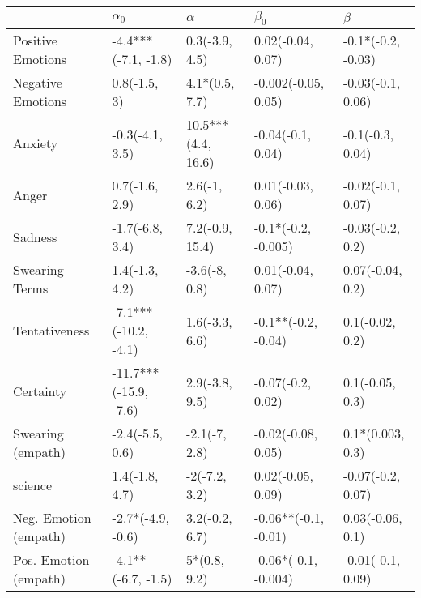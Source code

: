 \begin{tabular}{lllll}
\toprule
{} &             $\alpha_0$ &            $\alpha$ &             $\beta_0$ &             $\beta$ \\
\midrule
Positive Emotions     &    -4.4***(-7.1, -1.8) &      0.3(-3.9, 4.5) &     0.02(-0.04, 0.07) &  -0.1*(-0.2, -0.03) \\
Negative Emotions     &           0.8(-1.5, 3) &      4.1*(0.5, 7.7) &   -0.002(-0.05, 0.05) &   -0.03(-0.1, 0.06) \\
Anxiety               &        -0.3(-4.1, 3.5) &  10.5***(4.4, 16.6) &     -0.04(-0.1, 0.04) &    -0.1(-0.3, 0.04) \\
Anger                 &         0.7(-1.6, 2.9) &        2.6(-1, 6.2) &     0.01(-0.03, 0.06) &   -0.02(-0.1, 0.07) \\
Sadness               &        -1.7(-6.8, 3.4) &     7.2(-0.9, 15.4) &   -0.1*(-0.2, -0.005) &    -0.03(-0.2, 0.2) \\
Swearing Terms        &         1.4(-1.3, 4.2) &       -3.6(-8, 0.8) &     0.01(-0.04, 0.07) &    0.07(-0.04, 0.2) \\
Tentativeness         &   -7.1***(-10.2, -4.1) &      1.6(-3.3, 6.6) &   -0.1**(-0.2, -0.04) &     0.1(-0.02, 0.2) \\
Certainty             &  -11.7***(-15.9, -7.6) &      2.9(-3.8, 9.5) &     -0.07(-0.2, 0.02) &     0.1(-0.05, 0.3) \\
Swearing (empath)     &        -2.4(-5.5, 0.6) &       -2.1(-7, 2.8) &    -0.02(-0.08, 0.05) &    0.1*(0.003, 0.3) \\
science               &         1.4(-1.8, 4.7) &       -2(-7.2, 3.2) &     0.02(-0.05, 0.09) &   -0.07(-0.2, 0.07) \\
Neg. Emotion (empath) &      -2.7*(-4.9, -0.6) &      3.2(-0.2, 6.7) &  -0.06**(-0.1, -0.01) &    0.03(-0.06, 0.1) \\
Pos. Emotion (empath) &     -4.1**(-6.7, -1.5) &        5*(0.8, 9.2) &  -0.06*(-0.1, -0.004) &   -0.01(-0.1, 0.09) \\
\bottomrule
\end{tabular}

